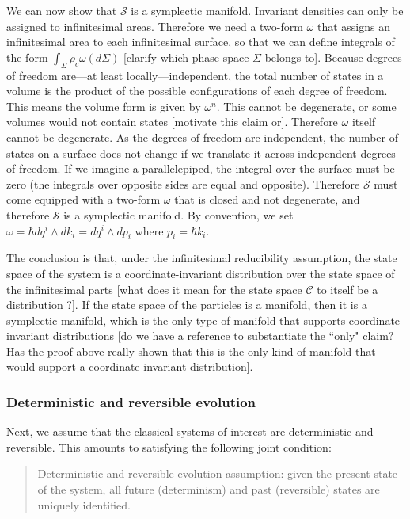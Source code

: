 \documentclass[letterpaper]{article}
\begin{document}
We can now show that $\mathcal{S}$ is a symplectic manifold. Invariant densities can only be assigned to infinitesimal areas. Therefore we need a two-form $\omega$ that assigns an infinitesimal area to each infinitesimal surface, so that we can define integrals of the form $\int_{\Sigma} \rho_c \omega(d\Sigma)$ [clarify which phase space $\Sigma$ belongs to]. Because degrees of freedom are---at least locally---independent, the total number of states in a volume is the product of the possible configurations of each degree of freedom. This means the volume form is given by $\omega^n$. This cannot be degenerate, or some volumes would not contain states [motivate this claim or]. Therefore $\omega$ itself cannot be degenerate. As the degrees of freedom are independent, the number of states on a surface does not change if we translate it across independent degrees of freedom. If we imagine a parallelepiped, the integral over the surface must be zero (the integrals over opposite sides are equal and opposite). Therefore $\mathcal{S}$ must come equipped with a two-form $\omega$ that is closed and not degenerate, and therefore $\mathcal{S}$ is a symplectic manifold. By convention, we set $\omega = \hbar dq^i \wedge dk_i = dq^i \wedge dp_i$ where $p_i = \hbar k_i$.

The conclusion is that, under the infinitesimal reducibility assumption, the state space of the system is a coordinate-invariant distribution over the state space of the infinitesimal parts [what does it mean for the state space $\mathcal{C} $ to itself be a distribution ?]. If the state space of the particles is a manifold, then it is a symplectic manifold, which is the only type of manifold that supports coordinate-invariant distributions [do we have a reference to substantiate the ``only" claim? Has the proof above really shown that this is the only kind of manifold that would support a coordinate-invariant distribution].

\subsubsection{Deterministic and reversible evolution}

Next, we assume that the classical systems of interest are deterministic and reversible. This amounts to satisfying the following joint condition:

\begin{quotation}

Deterministic and reversible evolution assumption: given the present state of the system, all future (determinism) and past (reversible) states are uniquely identified.

\end{quotation}
\end{document}
